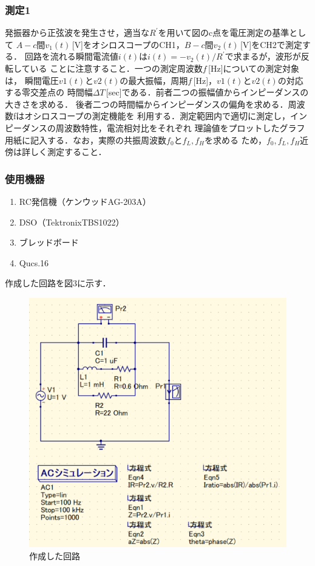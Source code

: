 \newpage

\subsubsection*{測定1}
発振器から正弦波を発生させ，適当な$R^{\prime}$を用いて図のc点を電圧測定の基準として
$A-c$間$v_1(t)$\,[V]をオシロスコープのCH1，$B-c$間$v_2(t)$\,[V]をCH2で測定する．
回路を流れる瞬間電流値$i(t)$は$i(t)= -v_2 (t)/R^{\prime}$で求まるが，波形が反転している
ことに注意すること．一つの測定周波数$f$\,[Hz]についての測定対象は，
瞬間電圧$v1(t)$と$v2(t)$の最大振幅，周期$f$\,[Hz]，$v1(t)$と$v2(t)$の対応する零交差点の
時間幅$ΔT$\,[sec]である．前者二つの振幅値からインピーダンスの大きさを求める．
後者二つの時間幅からインピーダンスの偏角を求める．周波数fはオシロスコープの測定機能を
利用する．測定範囲内で適切に測定し，インピーダンスの周波数特性，電流相対比をそれぞれ
理論値をプロットしたグラフ用紙に記入する．なお，実際の共振周波数$f_0$と$f_L,f_H$を求める
ため，$f_0,f_L,f_H$近傍は詳しく測定すること．

\subsubsection*{使用機器}
\begin{enumerate}
    \item RC発信機（ケンウッド\quad AG-203A）
    \item DSO（Tektronix\quad TBS1022）
    \item ブレッドボード
    \item Qucs.16
\end{enumerate}

作成した回路を図3に示す．

\begin{figure}[H]
    \begin{center}
        \includegraphics[scale=0.5]{figure3.pdf}
        \caption{作成した回路}
    \end{center}
\end{figure}